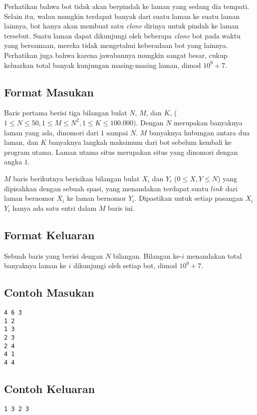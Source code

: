 \documentclass{article}
\begin{document}
Perhatikan bahwa bot tidak akan berpindah ke laman yang sedang dia tempati. Selain itu, walau mungkin terdapat banyak  dari suatu laman ke suatu laman lainnya, bot hanya akan membuat satu \textit{clone} dirinya untuk pindah ke laman tersebut. Suatu laman dapat dikunjungi oleh beberapa \textit{clone} bot pada waktu yang bersamaan, mereka tidak mengetahui keberadaan bot yang lainnya. Perhatikan juga bahwa karena jawabannya mungkin sangat besar, cukup keluarkan total banyak kunjungan masing-masing laman, dimod $10^9+7$.

\subsection*{Format Masukan}

Baris pertama berisi tiga bilangan bulat $N$, $M$, dan $K$, ($1 \leq N \leq 50, 1 \leq M \leq N^2, 1 \leq K \leq 100.000$). Dengan $N$ merupakan banyaknya laman yang ada, dinomori dari $1$ sampai $N$. $M$ banyaknya hubungan  antara dua laman, dan $K$ banyaknya langkah maksimum dari bot sebelum kembali ke program utama. Laman utama situs merupakan situs yang dinomori dengan angka $1$.

$M$ baris berikutnya berisikan bilangan bulat $X_i$ dan $Y_i$ ($0 \leq X,Y \leq N$) yang dipisahkan dengan sebuah spasi, yang menandakan terdapat suatu $\textit{link}$ dari laman bernomor $X_i$ ke laman bernomor $Y_i$. Dipastikan untuk setiap pasangan $X_i$ $Y_i$ hanya ada satu entri dalam $M$ baris ini.

\subsection*{Format Keluaran}

Sebuah baris yang berisi dengan $N$ bilangan. Bilangan ke-$i$ menandakan total banyaknya laman ke $i$ dikunjungi oleh setiap bot, dimod $10^9+7$.
\\

\begin{multicols}{2}
\subsection*{Contoh Masukan}
\begin{lstlisting}
4 6 3
1 2
1 3
2 3
2 4
4 1
4 4
\end{lstlisting}
\columnbreak
\subsection*{Contoh Keluaran}
\begin{lstlisting}
1 3 2 3
\end{lstlisting}
\vfill
\null
\end{multicols}
\end{document}

